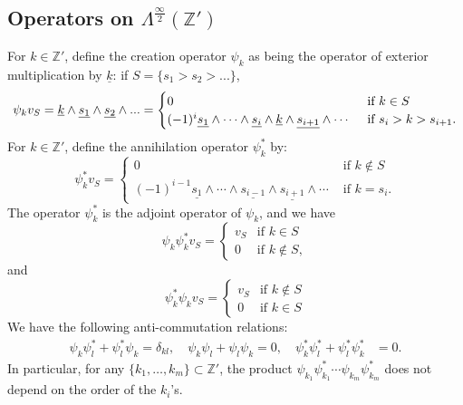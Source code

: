 \documentclass[12pt]{amsart}
\theoremstyle{definition}
\newcommand{\Z}{\mathbb{Z}}
\begin{document}
\subsection{Operators on $\Lambda^{\frac{\infty}{2}}(\Z')$}
For $k \in \Z'$, define the creation operator $\psi_k$ as being the operator of exterior multiplication by $\underline{k}$: if $S=\{ s_1 > s_2 > ... \} $,
\begin{equation} \label{eq:defpsi}
\psi_k v_S = \underline{k} \wedge \underline{s_1} \wedge \underline{s_2} \wedge ... \\
 =  \begin{cases} 0 &
\text{ if $k \in S$} \\
(-1)^i \underline{s_1} \wedge \cdots \wedge \underline{s_{i}} \wedge \underline{k} \wedge \underline{s_{i+1}}\wedge \cdots &
\text{ if $s_i > k > s_{i+1}$.}
\end{cases} 
\end{equation}
For $k \in \mathbb{Z}'$, define the annihilation operator $\psi_k^*$ by:
\begin{equation} \label{eq:defpsi*}
\psi_k^*v_S =\begin{cases} 0 &
\text{ if $k \notin S$} \\
(-1)^{i-1}\underline{s_1}\wedge \cdots \wedge \underline{s_{i-1}} \wedge \underline{s_{i+1}}\wedge \cdots &
\text{ if $k=s_i$}.
\end{cases}
\end{equation}
The operator $\psi_k^*$ is the adjoint operator of $\psi_k$, and we have
\begin{equation*}
\psi_k \psi_k^* v_S = \begin{cases} v_S & \text{if $k \in S$} \\
0 & \text{if $k \notin S$},
\end{cases}
\end{equation*}
and
\begin{equation*}
\psi_k^* \psi_k v_S = \begin{cases} v_S & \text{if $k \notin S$} \\
0 & \text{if $k \in S$}
\end{cases}
\end{equation*}
We have the following anti-commutation relations:
\begin{align*}
\psi_k \psi_l^* + \psi_l^*\psi_k = \delta_{kl}, \quad
\psi_k \psi_l + \psi_l \psi_k=0, \quad
\psi_k^*\psi_l^*+\psi_l^*\psi_k^* &=0.
\end{align*}
In particular, for any $\{k_1,\dots, k_m \} \subset \Z'$, the product $ \psi_{k_1}\psi_{k_1}^*\cdots \psi_{k_m}\psi_{k_m}^*$ does not depend on the order of the $k_i$'s. \\
\end{document}
